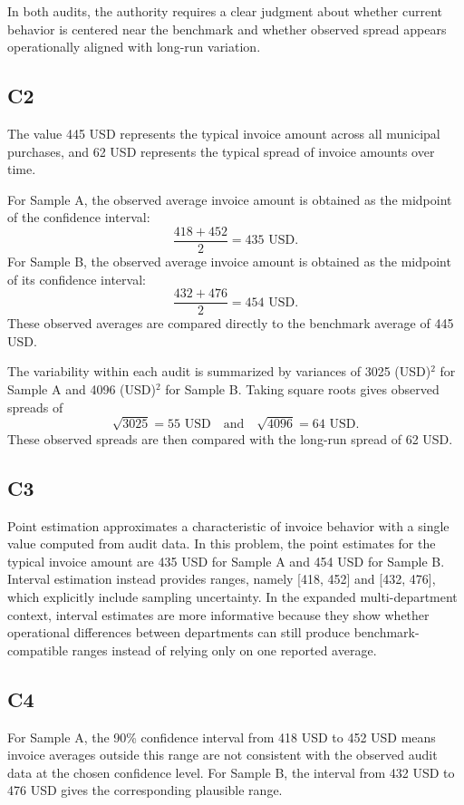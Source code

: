 \begin{ExamProblems}
		In both audits, the authority requires a clear judgment about whether current behavior is centered near the benchmark and whether observed spread appears operationally aligned with long-run variation.
		
		\subsection*{C2}
		The value 445 USD represents the typical invoice amount across all municipal purchases, and 62 USD represents the typical spread of invoice amounts over time.
		
		For Sample A, the observed average invoice amount is obtained as the midpoint of the confidence interval:
		\[
		\frac{418 + 452}{2} = 435 \text{ USD}.
		\]
		For Sample B, the observed average invoice amount is obtained as the midpoint of its confidence interval:
		\[
		\frac{432 + 476}{2} = 454 \text{ USD}.
		\]
		These observed averages are compared directly to the benchmark average of 445 USD.
		
		The variability within each audit is summarized by variances of 3025 (USD)$^2$ for Sample A and 4096 (USD)$^2$ for Sample B. Taking square roots gives observed spreads of
		\[
		\sqrt{3025} = 55 \text{ USD} \quad \text{and} \quad \sqrt{4096} = 64 \text{ USD}.
		\]
		These observed spreads are then compared with the long-run spread of 62 USD.
		
		\subsection*{C3}
		Point estimation approximates a characteristic of invoice behavior with a single value computed from audit data. In this problem, the point estimates for the typical invoice amount are 435 USD for Sample A and 454 USD for Sample B. Interval estimation instead provides ranges, namely [418, 452] and [432, 476], which explicitly include sampling uncertainty. In the expanded multi-department context, interval estimates are more informative because they show whether operational differences between departments can still produce benchmark-compatible ranges instead of relying only on one reported average.
		
		\subsection*{C4}
		For Sample A, the 90\% confidence interval from 418 USD to 452 USD means invoice averages outside this range are not consistent with the observed audit data at the chosen confidence level. For Sample B, the interval from 432 USD to 476 USD gives the corresponding plausible range.
		

\end{ExamProblems}
